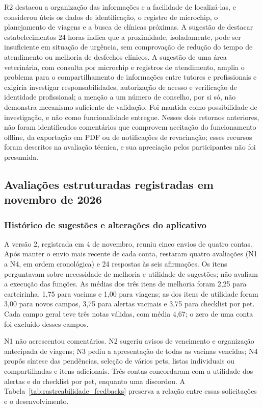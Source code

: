 \documentclass{UNESC}
\begin{document}
R2 destacou a organização das informações e a facilidade de localizá-las, e considerou úteis os dados de identificação, o registro de microchip, o planejamento de viagens e a busca de clínicas próximas. A sugestão de destacar estabelecimentos 24 horas indica que a proximidade, isoladamente, pode ser insuficiente em situação de urgência, sem comprovação de redução do tempo de atendimento ou melhoria de desfechos clínicos. A sugestão de uma área veterinária, com consulta por microchip e registros de atendimento, amplia o problema para o compartilhamento de informações entre tutores e profissionais e exigiria investigar responsabilidades, autorização de acesso e verificação de identidade profissional; a menção a um número de conselho, por si só, não demonstra mecanismo suficiente de validação. Foi mantida como possibilidade de investigação, e não como funcionalidade entregue. Nesses dois retornos anteriores, não foram identificados comentários que comprovem aceitação do funcionamento offline, da exportação em PDF ou de notificações de revacinação; esses recursos foram descritos na avaliação técnica, e sua apreciação pelos participantes não foi presumida.

\FloatBarrier
\subsection{Avaliações estruturadas registradas em novembro de 2026}
\label{sec:feedbacks_novembro}

\subsubsection{Histórico de sugestões e alterações do aplicativo}

A versão 2, registrada em 4 de novembro, reuniu cinco envios de quatro contas. Após manter o envio mais recente de cada conta, restaram quatro avaliações (N1 a N4, em ordem cronológica) e 24 respostas às seis afirmações. Os itens perguntavam sobre necessidade de melhoria e utilidade de sugestões; não avaliam a execução das funções. As médias dos três itens de melhoria foram 2,25 para carteirinha, 1,75 para vacinas e 1,00 para viagens; as dos itens de utilidade foram 3,00 para novos campos, 3,75 para alertas vacinais e 3,75 para checklist por pet. Cada campo geral teve três notas válidas, com média 4,67; o zero de uma conta foi excluído desses campos.

N1 não acrescentou comentários. N2 sugeriu avisos de vencimento e organização antecipada de viagens; N3 pediu a apresentação de todas as vacinas vencidas; N4 propôs síntese das pendências, seleção de vários pets, listas individuais ou compartilhadas e itens adicionais. Três contas concordaram com a utilidade dos alertas e do checklist por pet, enquanto uma discordou. A Tabela~\ref{tab:rastreabilidade_feedbacks} preserva a relação entre essas solicitações e o desenvolvimento.
\end{document}
